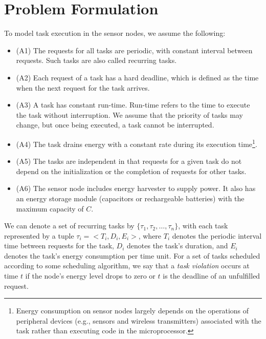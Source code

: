 \section{ Problem Formulation} \label{sec:problem}

To model task execution in the sensor nodes, we assume the following: 
\begin{itemize}
	\item (A1) The requests for all tasks are periodic, with constant interval between requests. Such tasks are also called recurring tasks. 
	\item (A2) Each request of a task has a hard deadline, which is defined as the time when the next request for the task arrives. 
	\item (A3) A task has constant run-time. Run-time refers to the time to execute the task without interruption. We assume that the priority of tasks may change, but once being executed, a task cannot be interrupted. 
	\item (A4) The task drains energy with a constant rate during its execution time\footnote{Energy consumption on sensor nodes largely depends on the operations of peripheral devices (e.g., sensors and wireless transmitters) associated with the task rather than executing code in the microprocessor.}.       
	\item (A5) The tasks are independent in that requests for a given task do not depend on the initialization or the completion of requests for other tasks.
	\item (A6) The sensor node includes energy harvester to supply power. It also has an energy storage module (capacitors or rechargeable batteries) with the maximum capacity of $C$. 
\end{itemize}

 
We can denote a set of recurring tasks by $\{\tau_1, \tau_2, \ldots, \tau_n\}$, with each task represented by a tuple $\tau_i = <T_i, D_i, E_i>$, where $T_i$ denotes the periodic interval time between requests for the task, $D_i$ denotes the task's duration, and $E_i$ denotes the task's energy consumption per time unit. For a set of tasks scheduled according to some scheduling algorithm, we say that a \textit{task violation} occurs at time $t$ if the node's energy level drops to zero or $t$ is the deadline of an unfulfilled request.  


